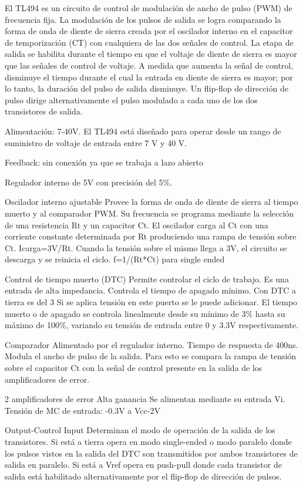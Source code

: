 El TL494 es un circuito de control de modulación de ancho de pulso (PWM) de frecuencia fija. 
La modulación de los pulsos de salida se logra comparando la forma de onda de diente de sierra creada por el oscilador interno en el capacitor de temporización (CT) con cualquiera de las dos señales de control. 
La etapa de salida se habilita durante el tiempo en que el voltaje de diente de sierra es mayor que las señales de control de voltaje. 
A medida que aumenta la señal de control, disminuye el tiempo durante el cual la entrada en diente de sierra es mayor; por lo tanto, la duración del pulso de salida disminuye. 
Un flip-flop de dirección de pulso dirige alternativamente el pulso modulado a cada uno de los dos transistores de salida.


Alimentación: 7-40V.
El TL494 está diseñado para operar desde un rango de suministro de voltaje de entrada entre 7 V y 40 V.

Feedback: sin conexión ya que se trabaja a lazo abierto

Regulador interno de 5V con precisión del 5\%. 

Oscilador interno ajustable 
Provee la forma de onda de diente de sierra al tiempo muerto y al comparador PWM. 
Su frecuencia se programa mediante la selección de una resistencia Rt y un capacitor Ct. 
El oscilador carga al Ct con una corriente constante determinada por Rt produciendo una rampa de tensión sobre Ct.
Icarga=3V/Rt.
Cuando la tensión sobre el mismo llega a 3V, el circuito se descarga y se reinicia el ciclo. 
f=1/(Rt*Ct) para single ended 

Control de tiempo muerto (DTC)
Permite controlar el ciclo de trabajo. 
Es una entrada de alta impedancia. 
Controla el tiempo de apagado mínimo. Con DTC a tierra es del 3%
Si se aplica tensión en este puerto se le puede adicionar.
El tiempo muerto o de apagado se controla linealmente desde su mínimo de 3\% hasta su máximo de 100\%, 
variando su tensión de entrada entre 0 y 3.3V respectivamente. 

Comparador 
Alimentado por el regulador interno. 
Tiempo de respuesta de 400ns. 
Modula el ancho de pulso de la salida. Para esto se compara la rampa de tensión sobre el capacitor Ct con la señal de control
presente en la salida de los amplificadores de error. 

2 amplificadores de error 
Alta ganancia
Se alimentan mediante su entrada Vi. 
Tensión de MC de entrada: -0.3V a Vcc-2V

Output-Control Input
Determinan el modo de operación de la salida de los transistores. 
Si está a tierra opera en modo single-ended o modo paralelo donde los pulsos vistos en la salida del DTC son transmitidos por ambos transistores de salida en paralelo.
Si está a Vref opera en push-pull donde cada transistor de salida está habilitado alternativamente por el flip-flop de dirección de pulsos.

